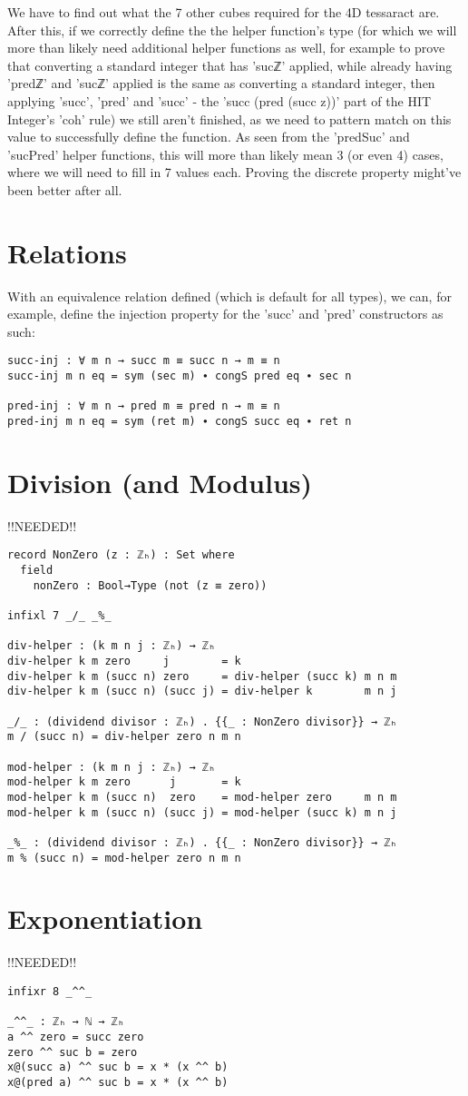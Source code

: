 We have to find out what the 7 other cubes required for the 4D tessaract are. After this, if we correctly define the the helper function's type (for which we will more than likely need additional helper functions as well, for example to prove that converting a standard integer that has 'sucℤ' applied, while already having 'predℤ' and 'sucℤ' applied is the same as converting a standard integer, then applying 'succ', 'pred' and 'succ' - the 'succ (pred (succ z))' part of the HIT Integer's 'coh' rule) we still aren't finished, as we need to pattern match on this value to successfully define the function. As seen from the 'predSuc' and 'sucPred' helper functions, this will more than likely mean 3 (or even 4) cases, where we will need to fill in 7 values each.
Proving the discrete property might've been better after all.

\section{Relations}
With an equivalence relation defined (which is default for all types), we can, for example, define the injection property for the 'succ' and 'pred' constructors as such:
\begin{verbatim}
succ-inj : ∀ m n → succ m ≡ succ n → m ≡ n
succ-inj m n eq = sym (sec m) ∙ congS pred eq ∙ sec n

pred-inj : ∀ m n → pred m ≡ pred n → m ≡ n
pred-inj m n eq = sym (ret m) ∙ congS succ eq ∙ ret n
\end{verbatim}

\section{Division (and Modulus)}
!!NEEDED!!
\begin{verbatim}
record NonZero (z : ℤₕ) : Set where
  field
    nonZero : Bool→Type (not (z ≡ zero))

infixl 7 _/_ _%_

div-helper : (k m n j : ℤₕ) → ℤₕ
div-helper k m zero     j        = k
div-helper k m (succ n) zero     = div-helper (succ k) m n m
div-helper k m (succ n) (succ j) = div-helper k        m n j

_/_ : (dividend divisor : ℤₕ) . {{_ : NonZero divisor}} → ℤₕ
m / (succ n) = div-helper zero n m n

mod-helper : (k m n j : ℤₕ) → ℤₕ
mod-helper k m zero      j       = k
mod-helper k m (succ n)  zero    = mod-helper zero     m n m
mod-helper k m (succ n) (succ j) = mod-helper (succ k) m n j

_%_ : (dividend divisor : ℤₕ) . {{_ : NonZero divisor}} → ℤₕ
m % (succ n) = mod-helper zero n m n
\end{verbatim}

\section{Exponentiation}
!!NEEDED!!
\begin{verbatim}
infixr 8 _^^_

_^^_ : ℤₕ → ℕ → ℤₕ
a ^^ zero = succ zero
zero ^^ suc b = zero
x@(succ a) ^^ suc b = x * (x ^^ b)
x@(pred a) ^^ suc b = x * (x ^^ b)
\end{verbatim}
